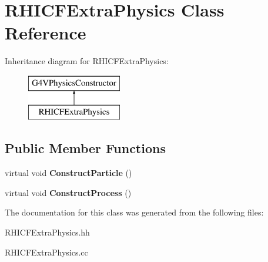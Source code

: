 \hypertarget{class_r_h_i_c_f_extra_physics}{}\section{R\+H\+I\+C\+F\+Extra\+Physics Class Reference}
\label{class_r_h_i_c_f_extra_physics}
Inheritance diagram for R\+H\+I\+C\+F\+Extra\+Physics\+:\begin{figure}[H]
\begin{center}
\leavevmode
\includegraphics[height=2.000000cm]{class_r_h_i_c_f_extra_physics}
\end{center}
\end{figure}
\subsection*{Public Member Functions}
\begin{DoxyCompactItemize}
\item 
\hypertarget{class_r_h_i_c_f_extra_physics_aed1fbbadeeaa965b447e0f452d093e66}{}virtual void {\bfseries Construct\+Particle} ()\label{class_r_h_i_c_f_extra_physics_aed1fbbadeeaa965b447e0f452d093e66}

\item 
\hypertarget{class_r_h_i_c_f_extra_physics_af5ec71a267db3f26879f1773c5d512b4}{}virtual void {\bfseries Construct\+Process} ()\label{class_r_h_i_c_f_extra_physics_af5ec71a267db3f26879f1773c5d512b4}

\end{DoxyCompactItemize}


The documentation for this class was generated from the following files\+:\begin{DoxyCompactItemize}
\item 
R\+H\+I\+C\+F\+Extra\+Physics.\+hh\item 
R\+H\+I\+C\+F\+Extra\+Physics.\+cc\end{DoxyCompactItemize}
